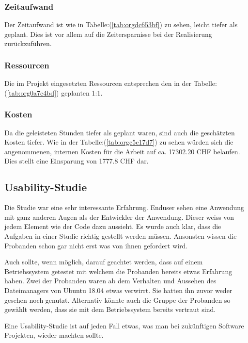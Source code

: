 \subsubsection{Zeitaufwand}
\label{sec:orgd0a21b2}

Der Zeitaufwand ist wie in Tabelle:(\ref{tab:orgdc653bf}) zu sehen, leicht tiefer als
geplant. Dies ist vor allem auf die Zeitersparnisse bei der Realisierung
zurückzuführen.

\subsubsection{Ressourcen}
\label{sec:org2b5e3d5}

Die im Projekt eingesetzten Ressourcen entsprechen den in der
Tabelle:(\ref{tab:org0a7c4bd}) geplanten 1:1.

\subsubsection{Kosten}
\label{sec:org30be751}

Da die geleisteten Stunden tiefer als geplant waren, sind auch die geschätzten
Kosten tiefer. Wie in der Tabelle:(\ref{tab:orgc5c17d7}) zu sehen würden sich die
angenommenen, internen Kosten für die Arbeit auf ca. 17302.20 CHF belaufen.
Dies stellt eine Einsparung von 1777.8 CHF dar.

\subsection{Usability-Studie}
\label{sec:orgd81cd12}

Die Studie war eine sehr interessante Erfahrung. Enduser sehen eine Anwendung
mit ganz anderen Augen als der Entwickler der Anwendung. Dieser weiss von jedem
Element wie der Code dazu aussieht. Es wurde auch klar, dass die Aufgaben in
einer Studie richtig gestellt werden müssen. Ansonsten wissen die Probanden
schon gar nicht erst was von ihnen gefordert wird.

Auch sollte, wenn möglich, darauf geachtet werden, dass auf einem Betriebssystem
getestet mit welchem die Probanden bereits etwas Erfahrung haben. Zwei der
Probanden waren ab dem Verhalten und Aussehen des Dateimanagers von Ubuntu
18.04 etwas verwirrt. Sie hatten ihn zuvor weder gesehen noch genutzt.
Alternativ könnte auch die Gruppe der Probanden so gewählt werden, dass sie mit
dem Betriebssystem bereits vertraut sind.

Eine Usability-Studie ist auf jeden Fall etwas, was man bei
zukünftigen Software Projekten, wieder machten sollte.


